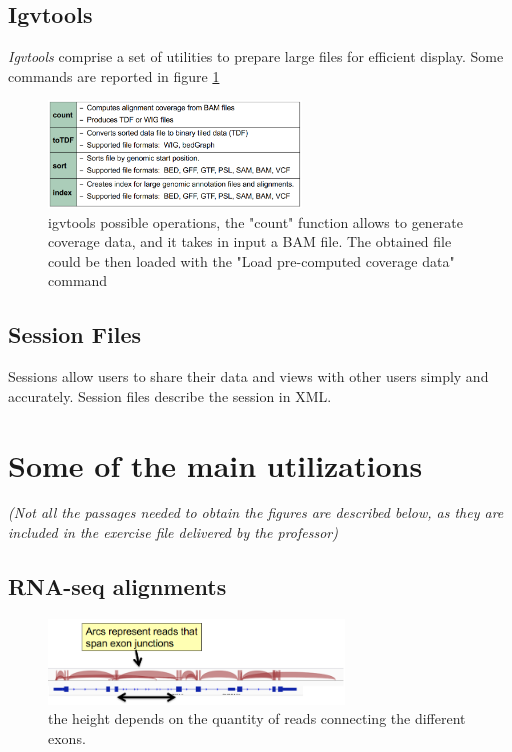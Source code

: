 \subsection{Igvtools}
\textit{Igvtools} comprise a set of utilities to prepare large files for efficient
display. Some commands are reported in figure \ref{fig:commands}

\begin{figure}[H]
    \centering
    \includegraphics[width=0.6\textwidth]{igvtools.PNG}
    \caption{igvtools possible operations, the "count" function allows to generate coverage data, and it takes in input a BAM file. The obtained 
    file could be then loaded with the "Load pre-computed coverage data" command}
    \label{fig:commands}
\end{figure}

\subsection{Session Files}
Sessions allow users to share their data and views with other users simply and accurately. Session files describe the session in XML.

\section{Some of the main utilizations}
\textit{(Not all the passages needed to obtain the figures are described below, as they are included in the exercise file delivered by the professor)}

\subsection{RNA-seq alignments}
\begin{figure}[H]
    \centering
    \includegraphics[width=0.7\textwidth]{RNAseqAlign.PNG}
    \caption{the height depends on the quantity of reads connecting the different exons.}
    \label{fig:RNAseq}
\end{figure}

